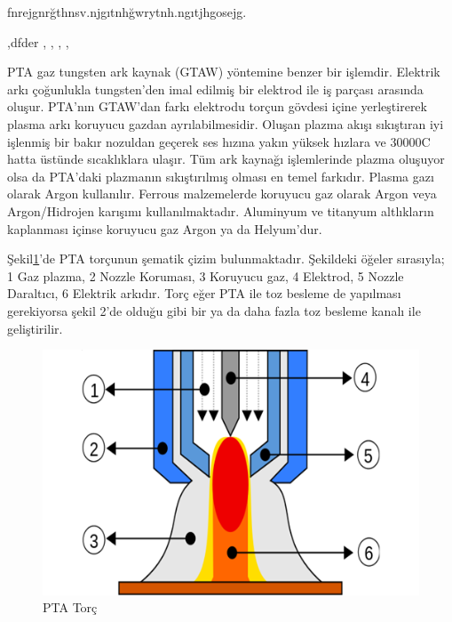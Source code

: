 



fnrejgnrğthnsv.njgıtnhğwrytnh.ngıtjhgosejg. \parencite{celik_microstructure_2013} \parencite{gatto_plasma_2004}

\cite{yazdi_microstructure_2015},dfder \cite{keehan_influence_2006}, \cite{guo_microstructure_2014}, \cite{kim_variation_2013}, \cite{xibao_metallurgical_2005-1}, \cite{jin_effect_1997}


PTA gaz tungsten ark kaynak (GTAW) yöntemine benzer bir işlemdir. Elektrik arkı çoğunlukla tungsten’den imal edilmiş bir elektrod ile iş parçası arasında oluşur. PTA’nın GTAW’dan farkı elektrodu torçun gövdesi içine yerleştirerek plasma arkı koruyucu gazdan ayrılabilmesidir. Oluşan plazma akışı sıkıştıran iyi işlenmiş bir bakır nozuldan geçerek ses hızına yakın yüksek hızlara ve 30000C hatta üstünde sıcaklıklara ulaşır. Tüm ark kaynağı işlemlerinde plazma oluşuyor olsa da PTA’daki plazmanın sıkıştırılmış olması en temel farkıdır. Plasma gazı olarak Argon kullanılır. Ferrous malzemelerde koruyucu gaz olarak Argon veya Argon/Hidrojen karışımı kullanılmaktadır. Aluminyum ve titanyum altlıkların kaplanması içinse koruyucu gaz Argon ya da Helyum’dur. 

Şekil\ref{fig:PtaTorc}’de PTA torçunun şematik çizim bulunmaktadır. Şekildeki öğeler sırasıyla; 1 Gaz plazma, 2 Nozzle Koruması, 3 Koruyucu gaz, 4 Elektrod, 5 Nozzle Daraltıcı, 6 Elektrik arkıdır. Torç eğer PTA ile toz besleme de yapılması gerekiyorsa şekil 2’de olduğu gibi bir ya da daha fazla toz besleme kanalı ile geliştirilir.

\begin{figure}[h]
\caption{PTA Torç}\label{fig:PtaTorc}
\includegraphics[width=\textwidth]{ptaTorc}
\end{figure}

